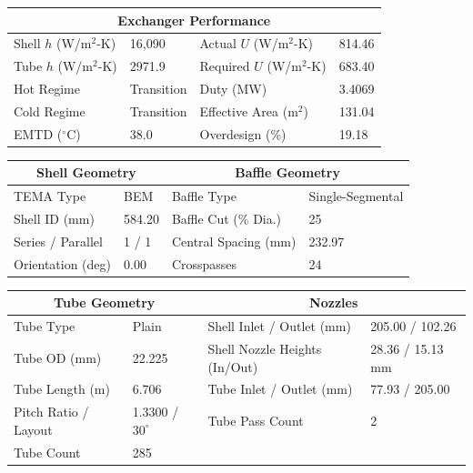 \documentclass[12pt]{article}
\begin{document}
\begin{table}[H]
\centering
\small
\begin{tabular}{ll|ll}
\toprule
\multicolumn{4}{c}{\textbf{Exchanger Performance}} \\
\midrule
Shell $h$ (W/m$^2$-K) & 16{,}090 & Actual $U$ (W/m$^2$-K) & 814.46 \\
Tube $h$ (W/m$^2$-K) & 2971.9 & Required $U$ (W/m$^2$-K) & 683.40 \\
Hot Regime & Transition & Duty (MW) & 3.4069 \\
Cold Regime & Transition & Effective Area (m$^2$) & 131.04 \\
EMTD ($^\circ$C) & 38.0 & Overdesign (\%) & 19.18 \\
\bottomrule
\end{tabular}
\end{table}

\begin{table}[H]
\centering
\small
\begin{tabular}{ll|ll}
\toprule
\multicolumn{2}{c}{\textbf{Shell Geometry}} & \multicolumn{2}{c}{\textbf{Baffle Geometry}} \\
\midrule
TEMA Type & BEM & Baffle Type & Single-Segmental \\
Shell ID (mm) & 584.20 & Baffle Cut (\% Dia.) & 25 \\
Series / Parallel & 1 / 1 & Central Spacing (mm) & 232.97 \\
Orientation (deg) & 0.00 & Crosspasses & 24 \\
\bottomrule
\end{tabular}
\end{table}

\begin{table}[H]
\centering
\small
\begin{tabular}{ll|ll}
\toprule
\multicolumn{2}{c}{\textbf{Tube Geometry}} & \multicolumn{2}{c}{\textbf{Nozzles}} \\
\midrule
Tube Type & Plain & Shell Inlet / Outlet (mm) & 205.00 / 102.26 \\
Tube OD (mm) & 22.225 & Shell Nozzle Heights (In/Out) & 28.36 / 15.13 mm \\
Tube Length (m) & 6.706 & Tube Inlet / Outlet (mm) & 77.93 / 205.00 \\
Pitch Ratio / Layout & 1.3300 / $30^\circ$ & Tube Pass Count & 2 \\
Tube Count & 285 & & \\
\bottomrule
\end{tabular}
\end{table}
\end{document}
